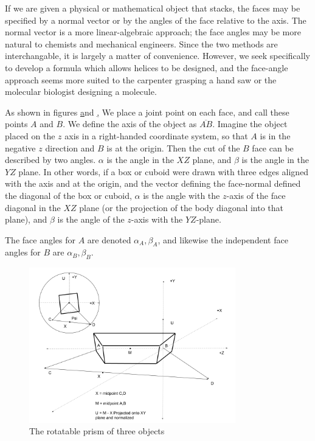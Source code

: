 \documentclass[11pt]{article}
\begin{document}
{If we are given a physical or mathematical object that stacks,
the faces may be specified by a normal vector or by the
angles of the face relative to the axis. The normal vector
is a more linear-algebraic approach; the face angles may be more
natural to chemists and mechanical engineers. Since
the two methods are interchangable, it is largely a matter of
convenience. However, we seek specifically to develop a formula
which allows helices to be designed, and the face-angle approach
seems more suited to the carpenter grasping a hand saw or the
molecular biologist designing a molecule.

As shown in figures \href{fig:intrinsicdiagram} and \href{fig:jointdiagram},
We place a joint point on each face, and call these points $A$ and $B$.
We define the axis of the object as $\overline{AB}$. Imagine the
object placed on the $z$ axis in a right-handed coordinate system, so that
$A$ is in the negative $z$ direction and $B$ is at the origin. Then
the cut of the $B$ face can be described by two angles. $\alpha$ is the
angle in the $XZ$ plane, and $\beta$ is the angle in the $YZ$ plane.
In other words, if a box or cuboid were drawn with three edges aligned
with the axis and at the origin, and the vector defining the face-normal
defined the diagonal of the box or cuboid, $\alpha$ is the angle with the $z$-axis
of the
face diagonal in the $XZ$ plane (or the projection of the body diagonal
into that plane), and $\beta$ is the angle of the $z$-axis with the $YZ$-plane.

The face angles for $A$ are denoted $\alpha_A, \beta_A$, and likewise
the independent face angles for $B$ are $\alpha_B, \beta_B$.


\begin{figure}
     \centering
     \includegraphics[width=0.80\textwidth]{figures/ObjectForStackingSetup.png}
     \caption{The rotatable prism of three objects}
  \label{fig:intrinsicdiagram}
\end{figure}

}
\end{document}
